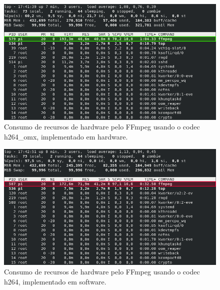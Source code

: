 \begin{figure}[H]
	\centering
	\includegraphics[width=1\textwidth]{figuras/top_ffmpeg_h264_omx.png}
	\caption{Consumo de recursos de hardware pelo FFmpeg usando o codec h264\_omx, implementado em hardware.}
	\label{fig:top_ffmpeg_h264_omx}
\end{figure}

\begin{figure}[H]
	\centering
	\includegraphics[width=1\textwidth]{figuras/top_ffmpeg_h264.png}
	\caption{Consumo de recursos de hardware pelo FFmpeg usando o codec h264, implementado em software.}
	\label{fig:top_ffmpeg_h264}
\end{figure}
